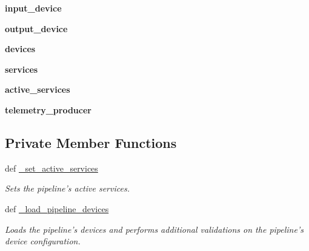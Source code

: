 \begin{DoxyCompactItemize}
\item 
\hypertarget{classhwm_1_1hardware_1_1pipelines_1_1pipeline_1_1_pipeline_a24346439d6c2932d4f2c7bcf3ca4226f}{{\bfseries input\-\_\-device}}\label{classhwm_1_1hardware_1_1pipelines_1_1pipeline_1_1_pipeline_a24346439d6c2932d4f2c7bcf3ca4226f}

\item 
\hypertarget{classhwm_1_1hardware_1_1pipelines_1_1pipeline_1_1_pipeline_aaa028eee1130c878aab0cd4e364eabc8}{{\bfseries output\-\_\-device}}\label{classhwm_1_1hardware_1_1pipelines_1_1pipeline_1_1_pipeline_aaa028eee1130c878aab0cd4e364eabc8}

\item 
\hypertarget{classhwm_1_1hardware_1_1pipelines_1_1pipeline_1_1_pipeline_ac47523ad157e5977bb4fb9acadf099ce}{{\bfseries devices}}\label{classhwm_1_1hardware_1_1pipelines_1_1pipeline_1_1_pipeline_ac47523ad157e5977bb4fb9acadf099ce}

\item 
\hypertarget{classhwm_1_1hardware_1_1pipelines_1_1pipeline_1_1_pipeline_a49bc22c9894b6e87a02d4be92d2a518b}{{\bfseries services}}\label{classhwm_1_1hardware_1_1pipelines_1_1pipeline_1_1_pipeline_a49bc22c9894b6e87a02d4be92d2a518b}

\item 
\hypertarget{classhwm_1_1hardware_1_1pipelines_1_1pipeline_1_1_pipeline_a2c1ac045f6d0e9bc262541984d18a13e}{{\bfseries active\-\_\-services}}\label{classhwm_1_1hardware_1_1pipelines_1_1pipeline_1_1_pipeline_a2c1ac045f6d0e9bc262541984d18a13e}

\item 
\hypertarget{classhwm_1_1hardware_1_1pipelines_1_1pipeline_1_1_pipeline_afc0ca439434b357d8a037d1e0c8e05cd}{{\bfseries telemetry\-\_\-producer}}\label{classhwm_1_1hardware_1_1pipelines_1_1pipeline_1_1_pipeline_afc0ca439434b357d8a037d1e0c8e05cd}

\end{DoxyCompactItemize}
\subsection*{Private Member Functions}
\begin{DoxyCompactItemize}
\item 
def \hyperlink{classhwm_1_1hardware_1_1pipelines_1_1pipeline_1_1_pipeline_a09b7b495be9a6ad0240e72f17e453822}{\-\_\-set\-\_\-active\-\_\-services}
\begin{DoxyCompactList}\small\item\em Sets the pipeline's active services. \end{DoxyCompactList}\item 
def \hyperlink{classhwm_1_1hardware_1_1pipelines_1_1pipeline_1_1_pipeline_ae6073fa7336e8f2f9b4a9c71a61a5ad0}{\-\_\-load\-\_\-pipeline\-\_\-devices}
\begin{DoxyCompactList}\small\item\em Loads the pipeline's devices and performs additional validations on the pipeline's device configuration. \end{DoxyCompactList}\end{DoxyCompactItemize}
